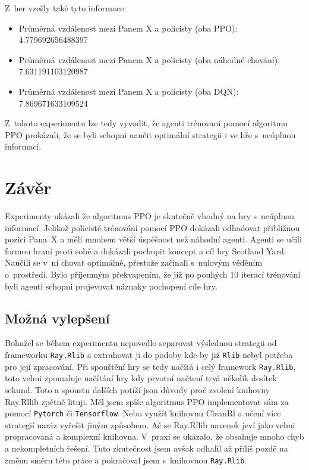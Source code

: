 Z~her vzešly také tyto informace:
\begin{itemize}
  \item Průměrná vzdálenost mezi Panem X a policisty (oba PPO): 4.779692656488397
  \item Průměrná vzdálenost mezi Panem X a policisty (oba náhodné chování): 7.631191103120987
  \item Průměrná vzdálenost mezi Panem X a policisty (oba DQN): 7.869671633109524
\end{itemize}

Z~tohoto experimentu lze tedy vyvodit, že agenti trénovaní pomocí algoritmu PPO prokázali, že se byli schopni naučit optimální strategii i ve hře s~neúplnou informací.

\chapter{Závěr}
\label{ch:zaver}

Experimenty ukázali že algoritmus PPO je skutečně vhodný na hry s~neúplnou informací.
Jelikož policisté trénování pomocí PPO dokázali odhadovat přibližnou pozici Pana~X a měli mnohem větší úspěšnost než náhodní agenti.
Agenti se učili formou hraní proti sobě a dokázali pochopit koncept a cíl hry Scotland Yard.
Naučili se v~ní chovat optímálně, přestože začínali s~nulovým věděním o~prostředí.
Bylo příjemným překvapením, že již po pouhých 10 iterací trénování byli agenti schopni projevovat náznaky pochopení cíle hry.

\section*{Možná vylepšení}
\label{sec:mozna-vylepseni}

Bohužel se během experimentu nepovedlo separovat výslednou strategii od frameworku \texttt{Ray.Rlib} a extrahovat ji do podoby kde by již \texttt{Rlib} nebyl potřeba pro její zpracování.
Při spouštění hry se tedy načítá i celý framework \texttt{Ray.Rlib}, toto velmi zpomaluje načítání hry kdy prvotní načtení trvá několik desítek sekund.
Toto a spoustu dalších potíží jsou důvody proč zvolení knihovny Ray.Rllib zpětně lituji.
Měl jsem spíše algoritmus PPO implementovat sám za pomocí \texttt{Pytorch} či \texttt{Tensorflow}.
Nebo využít knihovnu CleanRl a učení více strategií naráz vyřešit jiným způsobem.
Ač se Ray.Rllib navenek jeví jako velmi propracovaná a komplexní knihovna.
V~praxi se ukázalo, že obsahuje mnoho chyb a nekompletních řešení.
Tuto zkutečnost jsem avšak odhalil až příliš pozdě na změnu směru této práce a pokračoval jsem s~knihovnou \texttt{Ray.Rlib}.

